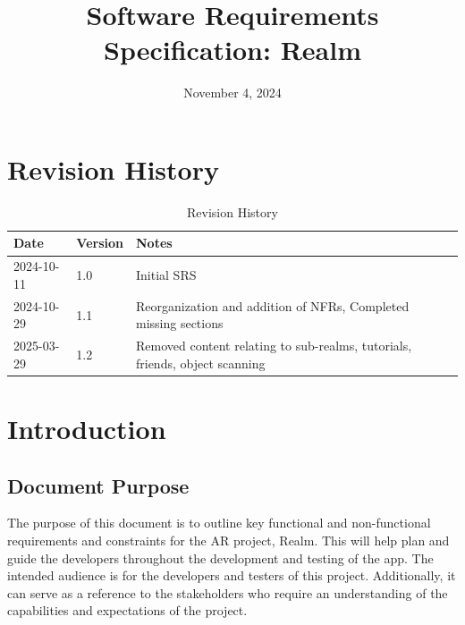 \documentclass{article}
\title{Software Requirements Specification: Realm\\\progname}
\author{\authname}
\date{November 4, 2024}
\begin{document}
\maketitle

\newpage{}

\tableofcontents

\section*{Revision History}

\begin{table}[hp]
    \begin{tabularx}{\textwidth}{p{3cm}p{2cm}X}
        \toprule {\textbf{Date}} & {\textbf{Version}} & {\textbf{Notes}}                                                \\
        \midrule
        2024-10-11               & 1.0                & Initial SRS                                                     \\
        \midrule
        2024-10-29               & 1.1                & Reorganization and addition of NFRs, Completed missing sections \\
        \midrule
        2025-03-29               & 1.2                & Removed content relating to sub-realms, tutorials, friends, object scanning \\
        \bottomrule
    \end{tabularx}
    \caption{Revision History} \label{rev_history_table}
\end{table}

\section{Introduction}

\subsection{Document Purpose}

The purpose of this document is to outline key functional and non-functional requirements and constraints for the AR project, Realm. This will help plan and guide the developers throughout the development and testing of the app. The intended audience is for the developers and testers of this project. Additionally, it can serve as a reference to the stakeholders who require an understanding of the capabilities and expectations of the project.
\end{document}
